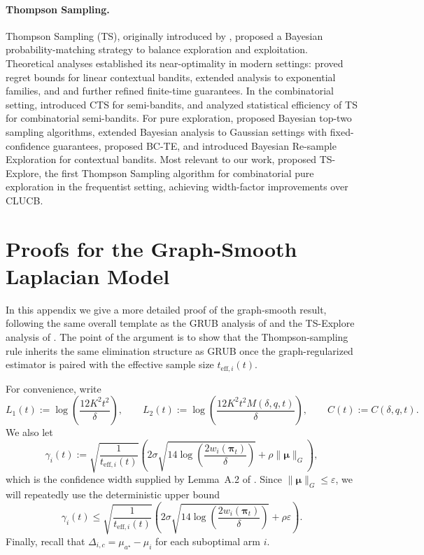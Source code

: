 \documentclass{article}
\begin{document}
\paragraph{Thompson Sampling.}
Thompson Sampling (TS), originally introduced by \cite{thompson1933likelihood}, proposed a Bayesian probability-matching strategy to balance exploration and exploitation. Theoretical analyses established its near-optimality in modern settings: \cite{agrawal2013thompson} proved regret bounds for linear contextual bandits, \cite{korda2013thompson} extended analysis to exponential families, and \cite{agrawal2013further} and \cite{kaufmann2012thompson} further refined finite-time guarantees. In the combinatorial setting, \cite{wang2018thompson} introduced CTS for semi-bandits, and \cite{perrault2020statistical} analyzed statistical efficiency of TS for combinatorial semi-bandits. For pure exploration, \cite{russo2016simple} proposed Bayesian top-two sampling algorithms, \cite{shang2020fixed} extended Bayesian analysis to Gaussian settings with fixed-confidence guarantees, \cite{lee2024thompson} proposed BC-TE, and \cite{li2021bayesian} introduced Bayesian Re-sample Exploration for contextual bandits. Most relevant to our work, \cite{wang2022thompson} proposed TS-Explore, the first Thompson Sampling algorithm for combinatorial pure exploration in the frequentist setting, achieving width-factor improvements over CLUCB.




\section{Proofs for the Graph-Smooth Laplacian Model}
\label{app:proofs-graph}

In this appendix we give a more detailed proof of the graph-smooth result, following the same overall template as the GRUB analysis of \citet{thaker2022maximizing} and the TS-Explore analysis of \citet{wang2022thompson}. The point of the argument is to show that the Thompson-sampling rule inherits the same elimination structure as GRUB once the graph-regularized estimator is paired with the effective sample size $t_{\mathrm{eff},i}(t)$.

For convenience, write
\[
L_1(t):=\log\!\left(\frac{12K^2t^2}{\delta}\right),
\qquad
L_2(t):=\log\!\left(\frac{12K^2t^2M(\delta,q,t)}{\delta}\right),
\qquad
C(t):=C(\delta,q,t).
\]
We also let
\[
\gamma_i(t)
:=
\sqrt{\frac{1}{t_{\mathrm{eff},i}(t)}}
\left(
2\sigma\sqrt{14\log\!\left(\frac{2w_i(\boldsymbol\pi_t)}{\delta}\right)}+\rho\|\bm\mu\|_G
\right),
\]
which is the confidence width supplied by Lemma~A.2 of \citet{thaker2022maximizing}. Since $\|\bm\mu\|_G\le \varepsilon$, we will repeatedly use the deterministic upper bound
\[
\gamma_i(t)
\le
\sqrt{\frac{1}{t_{\mathrm{eff},i}(t)}}
\left(
2\sigma\sqrt{14\log\!\left(\frac{2w_i(\boldsymbol\pi_t)}{\delta}\right)}+\rho\varepsilon
\right).
\]
Finally, recall that $\Delta_{i,c}=\mu_{a^\star}-\mu_i$ for each suboptimal arm $i$.
\end{document}
